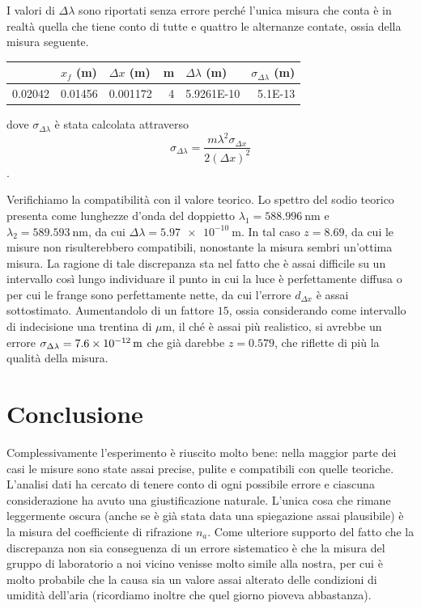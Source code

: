 \documentclass[a4paper,11pt]{article}
\begin{document}
I valori di $\Delta \lambda$ sono riportati senza errore perché l'unica misura che conta è in realtà quella che tiene conto di tutte e quattro le alternanze contate, ossia della misura seguente.

\begin{table}[htbp]
	\centering
	\begin{tabular}{rrrrrr}
		\bottomrule
		\rowcolor[rgb]{ .267,  .447,  .769} \multicolumn{1}{l}{\textcolor[rgb]{ 1,  1,  1}{\textbf{$x _i$ (m)}}} & \multicolumn{1}{l}{\textcolor[rgb]{ 1,  1,  1}{\textbf{$x _f$ (m)}}} & \multicolumn{1}{l}{\textcolor[rgb]{ 1,  1,  1}{\textbf{$\Delta x$ (m)}}} & \multicolumn{1}{l}{\textcolor[rgb]{ 1,  1,  1}{\textbf{m}}} & \multicolumn{1}{l}{\textcolor[rgb]{ 1,  1,  1}{\textbf{$\Delta \lambda$ (m)}}} & \multicolumn{1}{l}{\textcolor[rgb]{ 1,  1,  1}{\textbf{$\sigma _{\Delta \lambda}$ (m)}}} \\
		\toprule
		0.02042 & 0.01456 & 0.001172 & 4     & 5.9261E-10 & 5.1E-13 \\
		\toprule
	\end{tabular}%
\end{table}%

dove $\sigma _{\Delta \lambda}$ è stata calcolata attraverso $$\sigma _{\Delta \lambda} = \frac{m \lambda^2 \sigma _{\Delta x}}{2 (\Delta x) ^2}$$.

Verifichiamo la compatibilità con il valore teorico. Lo spettro del sodio teorico presenta come lunghezze d'onda del doppietto $\lambda _1 = \SI{588.996}{\nano \meter}$ e $\lambda _2 = \SI{589.593}{\nano \meter}$, da cui $\Delta \lambda = \SI{5.97e-10}{\meter}$. In tal caso $z = 8.69$, da cui le misure non risulterebbero compatibili, nonostante la misura sembri un'ottima misura. La ragione di tale discrepanza sta nel fatto che è assai difficile su un intervallo così lungo individuare il punto in cui la luce è perfettamente diffusa o per cui le frange sono perfettamente nette, da cui l'errore $d_{\Delta x}$ è assai sottostimato. Aumentandolo di un fattore $15$, ossia considerando come intervallo di indecisione una trentina di $\mu \text{m}$, il ché è assai più realistico, si avrebbe un errore $\sigma _{\Delta \lambda} = \SI{7.6E-12}{\meter}$ che già darebbe $z = 0.579$, che riflette di più la qualità della misura.

\section{Conclusione}
Complessivamente l'esperimento è riuscito molto bene: nella maggior parte dei casi le misure sono state assai precise, pulite e compatibili con quelle teoriche. L'analisi dati ha cercato di tenere conto di ogni possibile errore e ciascuna considerazione ha avuto una giustificazione naturale. L'unica cosa che rimane leggermente oscura (anche se è già stata data una spiegazione assai plausibile) è la misura del coefficiente di rifrazione $n _a$. Come ulteriore supporto del fatto che la discrepanza non sia conseguenza di un errore sistematico è che la misura del gruppo di laboratorio a noi vicino venisse molto simile alla nostra, per cui è molto probabile che la causa sia un valore assai alterato delle condizioni di umidità dell'aria (ricordiamo inoltre che quel giorno pioveva abbastanza).
\end{document}
